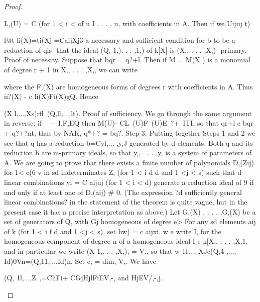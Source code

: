 \begin{proof}
\begin{mathematicalrecord}
L,(U) = C       (for 1 < i < of u I , . . , u, with coefficients in A. Then if we
              Uijuj                     t)


f@t li(X)=ti(Xj    =CaijXj3   a necessary and sufficient condition for b to
be a- reduction of qis -that the ideal (Q, 1,). . . ,1,) of k[X] is (X,, . . . ,X,)-
primary.
Proof of necessity. Suppose that bqr = q?+l. Then if M = M(X ) is a
monomial of degree r + 1 in X,, . . . ,X,, we can write



where the F,(X) are homogeneous                    forms of degrees r with coefficients in
A. Thus
        ii?(X) - c li(X)Fi(X)gQ.
Hence

         (X l,...,Xs)rfl~(Q,ll,...,lt).
Proof of sufficiency.                We go through     the same argument    in reverse: if
~~--~I,F,EQ    then
         M(U)-              CL~(U)F~(U)E~?+~ITI,
so that qr+l c bqr + q?+?nt; thus by NAK, q*+? = bq?.
    Step 3. Putting together Steps 1 and 2 we see that q has a reduction
b=Cyl,... ,y,J generated by d elements. Both q and its reduction b are
m-primary ideals, so that y,, . . . ,y, is a system of parameters of A. We
are going to prove that there exists a finite number of polynomials D,(Zij)
for 1< c(6 v in sd indeterminates Z, (for 1 < i d d and 1 <j < s) such that
d linear combinations yi = C aijuj (for 1 < i < d) generate a reduction ideal
of 9 if and only if at least one of D,(aij) # 0. (The expression ?d sufficiently
general linear combinations? in the statement of the theorem is quite vague,
hut in the present case it has a precise interpretation as above,)
   Let G,(X) , . . . ,G,(X) be a set of generators of Q, with Gj homogeneous
of degree e> For any sd elements aij of k (for 1 < i f d and 1 <j < s), set
hw) = c aijxi. w e write I, for the homogeneous component of degree n
of a homogeneous ideal I c k[X,, . . . ,X,1, and in particular               we write
(X 1,. . . ,X,), = V,, so that
            w 1I..., XJc(Q,4   ,..., Id)0Vn=(Q,11,...,Id)n.
Set c, = dim, V,. We have

          (Q, 1l,...,Z~,={CliFi+        CGjHjlFiEV,-,           and    HjEV/,-,j}.


\end{mathematicalrecord}
\end{proof}
